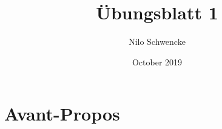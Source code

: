 \documentclass[a4paper,10pt]{article}
\title{Übungsblatt 1}
\author{Nilo Schwencke}
\date{October 2019}
\begin{document}
\maketitle

\section{Avant-Propos}
\end{document}
